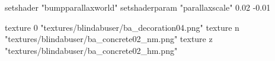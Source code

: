 	setshader "bumpparallaxworld"
	setshaderparam "parallaxscale" 0.02 -0.01

		texture 0 "textures/blindabuser/ba_decoration04.png"
		texture n "textures/blindabuser/ba_concrete02_nm.png"
		texture z "textures/blindabuser/ba_concrete02_hm.png"
